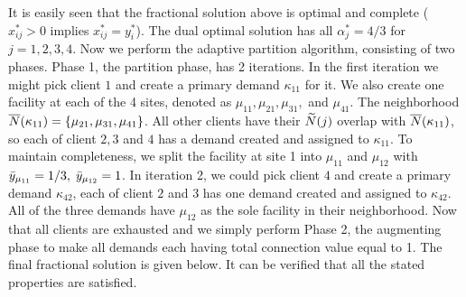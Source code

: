 \documentclass[11pt]{article}
\begin{document}
It is easily seen that the fractional solution above is optimal and
complete ($x_{ij}^\ast > 0$ implies $x_{ij}^\ast = y_i^\ast$). The
dual optimal solution has all $\alpha_j^\ast = 4/3$ for
$j=1,2,3,4$. Now we perform the adaptive partition algorithm,
consisting of two phases. Phase 1, the partition phase, has 2
iterations. In the first iteration we might pick client $1$ and create
a primary demand $\kappa_{11}$ for it. We also create one facility at
each of the 4 sites, denoted as $\mu_{11}, \mu_{21}, \mu_{31},$ and
$\mu_{41}$. The neighborhood ${\overline{N}}(\kappa_{11}) =
\{\mu_{21},\mu_{31},\mu_{41}\}$. All other clients have their
${\widetilde N}(j)$ overlap with ${\overline{N}}(\kappa_{11})$, so each of client
$2,3$ and $4$ has a demand created and assigned to $\kappa_{11}$. To
maintain completeness, we split the facility at site 1 into $\mu_{11}$
and $\mu_{12}$ with ${\bar y}_{\mu_{11}}=1/3,\; {\bar y}_{\mu_{12}} = 1$. In
iteration 2, we could pick client $4$ and create a primary demand
$\kappa_{42}$, each of client $2$ and $3$ has one demand created and
assigned to $\kappa_{42}$. All of the three demands have $\mu_{12}$ as
the sole facility in their neighborhood. Now that all clients are
exhausted and we simply perform Phase 2, the augmenting phase to make
all demands each having total connection value equal to 1. The final
fractional solution is given below. It can be verified that all the
stated properties are satisfied.
\end{document}
